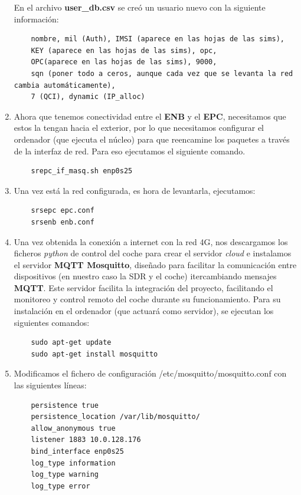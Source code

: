 \begin{enumerate}
En el archivo \textbf{user_db.csv} se creó un usuario nuevo con la siguiente información:
\begin{lstlisting}
    nombre, mil (Auth), IMSI (aparece en las hojas de las sims),
    KEY (aparece en las hojas de las sims), opc,
    OPC(aparece en las hojas de las sims), 9000,
    sqn (poner todo a ceros, aunque cada vez que se levanta la red cambia automáticamente),
    7 (QCI), dynamic (IP_alloc)
\end{lstlisting}

\item Ahora que tenemos conectividad entre el \textbf{ENB} y el \textbf{EPC}, necesitamos que estos la tengan hacia el exterior, por lo que necesitamos configurar el ordenador (que ejecuta el núcleo) para que reencamine los paquetes a través de la interfaz de red. Para eso ejecutamos el siguiente comando.

\begin{lstlisting}
    srepc_if_masq.sh enp0s25
\end{lstlisting}

\item Una vez está la red configurada, es hora de levantarla, ejecutamos:
\begin{lstlisting}
    srsepc epc.conf
    srsenb enb.conf
\end{lstlisting}

\item Una vez obtenida la conexión a internet con la red 4G, nos descargamos los ficheros \textit{python} de control del coche para crear el servidor \textit{cloud} e instalamos el servidor \textbf{MQTT Mosquitto}, diseñado para facilitar la comunicación entre dispositivos (en nuestro caso la SDR y el coche) itercambiando mensajes \textbf{MQTT}. Este servidor facilita la integración del proyecto, facilitando el monitoreo y control remoto del coche durante su funcionamiento.
Para su instalación en el ordenador (que actuará como servidor), se ejecutan los siguientes comandos:

\begin{lstlisting}
	sudo apt-get update
	sudo apt-get install mosquitto
\end{lstlisting}

\item Modificamos el fichero de configuración /etc/mosquitto/mosquitto.conf con las siguientes líneas:
\begin{lstlisting}
	persistence true
	persistence_location /var/lib/mosquitto/
	allow_anonymous true
	listener 1883 10.0.128.176
	bind_interface enp0s25
	log_type information
	log_type warning
	log_type error
\end{lstlisting}


\end{enumerate}
